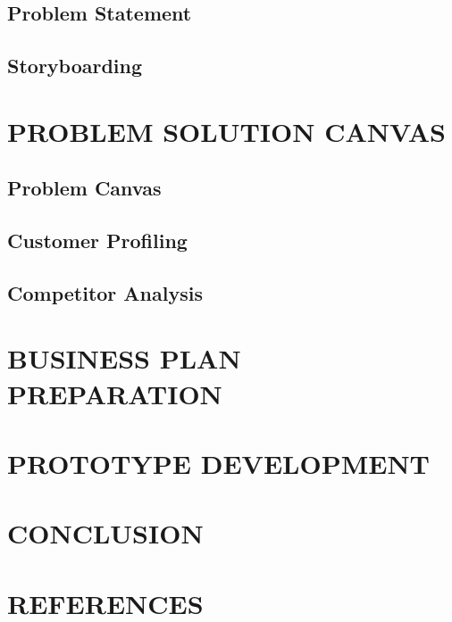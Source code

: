 \documentclass[a4paper,12pt]{report}
\begin{document}
\section{Problem Statement}
\section{Storyboarding}

\chapter{PROBLEM SOLUTION CANVAS}
\section{Problem Canvas}
\section{Customer Profiling}
\section{Competitor Analysis}

\chapter{BUSINESS PLAN PREPARATION}

\chapter{PROTOTYPE DEVELOPMENT}

\chapter{CONCLUSION}

\chapter{REFERENCES}
\end{document}
